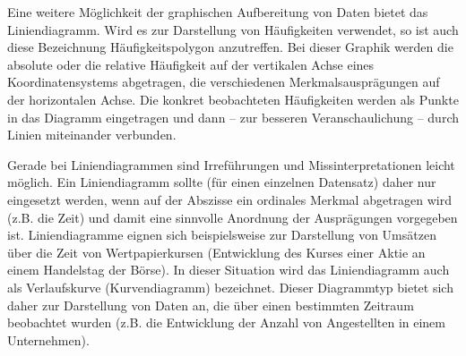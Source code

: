 \documentclass{lecture}
\begin{document}
    Eine weitere Möglichkeit der graphischen Aufbereitung von Daten bietet das Liniendiagramm.
    Wird es zur Darstellung von Häufigkeiten verwendet, so ist auch diese Bezeichnung Häufigkeitspolygon anzutreffen.
    Bei dieser Graphik werden die absolute oder die relative Häufigkeit auf der vertikalen Achse eines Koordinatensystems abgetragen, die verschiedenen Merkmalsausprägungen auf der horizontalen Achse.
    Die konkret beobachteten Häufigkeiten werden als Punkte in das Diagramm eingetragen und dann -- zur besseren Veranschaulichung -- durch Linien miteinander verbunden.
    \begin{center}
    \end{center}
    Gerade bei Liniendiagrammen sind Irreführungen und Missinterpretationen leicht möglich.
    Ein Liniendiagramm sollte (für einen einzelnen Datensatz) daher nur eingesetzt werden, wenn auf der Abszisse ein ordinales Merkmal abgetragen wird (z.B. die Zeit) und damit eine sinnvolle Anordnung der Ausprägungen vorgegeben ist.
    Liniendiagramme eignen sich beispielsweise zur Darstellung von Umsätzen über die Zeit von Wertpapierkursen (Entwicklung des Kurses einer Aktie an einem Handelstag der Börse).
    In dieser Situation wird das Liniendiagramm auch als Verlaufskurve (Kurvendiagramm) bezeichnet.
    Dieser Diagrammtyp bietet sich daher zur Darstellung von Daten an, die über einen bestimmten Zeitraum beobachtet wurden (z.B. die Entwicklung der Anzahl von Angestellten in einem Unternehmen).
\end{document}
